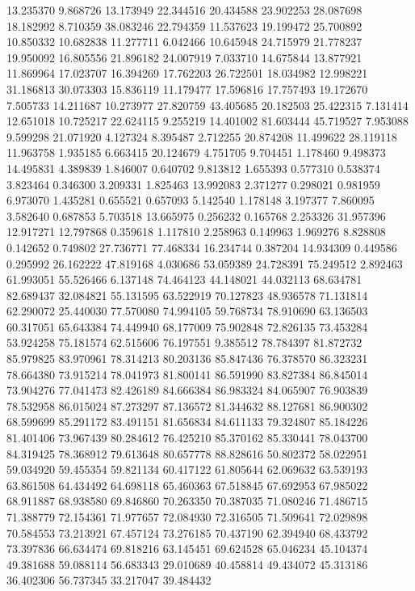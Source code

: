 13.235370
9.868726
13.173949
22.344516
20.434588
23.902253
28.087698
18.182992
8.710359
38.083246
22.794359
11.537623
19.199472
25.700892
10.850332
10.682838
11.277711
6.042466
10.645948
24.715979
21.778237
19.950092
16.805556
21.896182
24.007919
7.033710
14.675844
13.877921
11.869964
17.023707
16.394269
17.762203
26.722501
18.034982
12.998221
31.186813
30.073303
15.836119
11.179477
17.596816
17.757493
19.172670
7.505733
14.211687
10.273977
27.820759
43.405685
20.182503
25.422315
7.131414
12.651018
10.725217
22.624115
9.255219
14.401002
81.603444
45.719527
7.953088
9.599298
21.071920
4.127324
8.395487
2.712255
20.874208
11.499622
28.119118
11.963758
1.935185
6.663415
20.124679
4.751705
9.704451
1.178460
9.498373
14.495831
4.389839
1.846007
0.640702
9.813812
1.655393
0.577310
0.538374
3.823464
0.346300
3.209331
1.825463
13.992083
2.371277
0.298021
0.981959
6.973070
1.435281
0.655521
0.657093
5.142540
1.178148
3.197377
7.860095
3.582640
0.687853
5.703518
13.665975
0.256232
0.165768
2.253326
31.957396
12.917271
12.797868
0.359618
1.117810
2.258963
0.149963
1.969276
8.828808
0.142652
0.749802
27.736771
77.468334
16.234744
0.387204
14.934309
0.449586
0.295992
26.162222
47.819168
4.030686
53.059389
24.728391
75.249512
2.892463
61.993051
55.526466
6.137148
74.464123
44.148021
44.032113
68.634781
82.689437
32.084821
55.131595
63.522919
70.127823
48.936578
71.131814
62.290072
25.440030
77.570080
74.994105
59.768734
78.910690
63.136503
60.317051
65.643384
74.449940
68.177009
75.902848
72.826135
73.453284
53.924258
75.181574
62.515606
76.197551
9.385512
78.784397
81.872732
85.979825
83.970961
78.314213
80.203136
85.847436
76.378570
86.323231
78.664380
73.915214
78.041973
81.800141
86.591990
83.827384
86.845014
73.904276
77.041473
82.426189
84.666384
86.983324
84.065907
76.903839
78.532958
86.015024
87.273297
87.136572
81.344632
88.127681
86.900302
68.599699
85.291172
83.491151
81.656834
84.611133
79.324807
85.184226
81.401406
73.967439
80.284612
76.425210
85.370162
85.330441
78.043700
84.319425
78.368912
79.613648
80.657778
88.828616
50.802372
58.022951
59.034920
59.455354
59.821134
60.417122
61.805644
62.069632
63.539193
63.861508
64.434492
64.698118
65.460363
67.518845
67.692953
67.985022
68.911887
68.938580
69.846860
70.263350
70.387035
71.080246
71.486715
71.388779
72.154361
71.977657
72.084930
72.316505
71.509641
72.029898
70.584553
73.213921
67.457124
73.276185
70.437190
62.394940
68.433792
73.397836
66.634474
69.818216
63.145451
69.624528
65.046234
45.104374
49.381688
59.088114
56.683343
29.010689
40.458814
49.434072
45.313186
36.402306
56.737345
33.217047
39.484432
